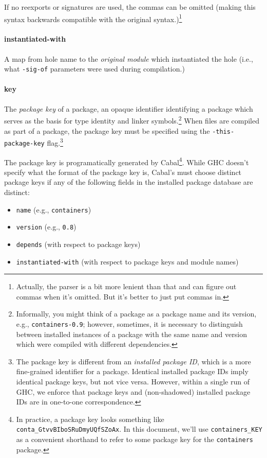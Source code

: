 \documentclass{article}
\begin{document}
If no reexports or signatures are used, the commas can be omitted
(making this syntax backwards compatible with the original syntax.)\footnote{Actually,
the parser is a bit more lenient than that and can figure out commas when it's
omitted. But it's better to just put commas in.}

\paragraph{instantiated-with} A map from hole name to the \emph{original
module} which instantiated the hole (i.e., what \texttt{-sig-of}
parameters were used during compilation.)

\paragraph{key} The \emph{package key} of a
package, an opaque identifier identifying a package
which serves as the basis for type identity and linker
symbols.\footnote{Informally, you might think of a package as a package
name and its version, e.g., \texttt{containers-0.9}; however, sometimes,
it is necessary to distinguish between installed instances of a package
with the same name and version which were compiled with different
dependencies.} When files are compiled as part of a package, the
package key must be specified using the \texttt{-this-package-key}
flag.\footnote{The package key is different from an
\emph{installed package ID}, which is a more fine-grained identifier for
a package.  Identical installed package IDs imply identical package
keys, but not vice versa.  However, within a single run of GHC, we
enforce that package keys and (non-shadowed) installed package IDs are
in one-to-one correspondence.}

The package key is programatically generated by Cabal\footnote{In
practice, a package key looks something like
\texttt{conta\_GtvvBIboSRuDmyUQfSZoAx}.  In this document, we'll use
\texttt{containers\_KEY} as a convenient shorthand to refer to some
package key for the \texttt{containers} package.}. While GHC doesn't
specify what the format of the package key is,  Cabal's must choose distinct package keys if
any of the following fields in the installed package database are
distinct:

\begin{itemize}
\item \texttt{name} (e.g., \texttt{containers})
\item \texttt{version} (e.g., \texttt{0.8})
\item \texttt{depends} (with respect to package keys)
\item \texttt{instantiated-with} (with respect to package keys and module names)
\end{itemize}
\end{document}
